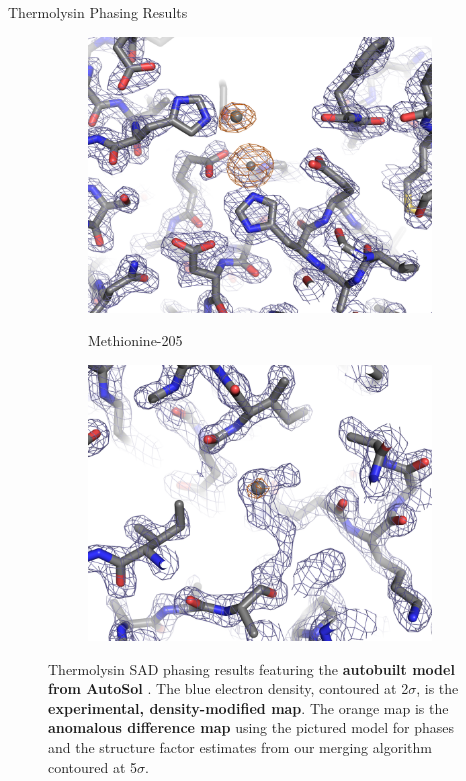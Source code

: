 \documentclass[final]{beamer}
\newlength{\colwidth}
\begin{document}
\begin{frame}[t]
\begin{columns}[t]
\begin{column}{\colwidth}
\begin{block}{Thermolysin Phasing Results}
\begin{figure}[]
\begin{subfigure}[t]{0.45\textwidth}
      \includegraphics[width=\textwidth]{figures/thermolysin/zinc.png}
    \end{subfigure}\hfill
    \begin{subfigure}[t]{0.45\textwidth}
      \centering
      Methionine-205\bigskip

      \includegraphics[width=\textwidth]{figures/thermolysin/sulfur_2.png}
    \end{subfigure}
    \RaggedRight
    \bigskip

    Thermolysin SAD phasing results featuring the \textbf{autobuilt model from AutoSol} \cite{terwilliger_decision-making_2009}. The blue electron density, contoured at 2$\sigma$, is the \textbf{experimental, density-modified map}. The orange map is the \textbf{anomalous difference map} using the pictured model for phases and the structure factor estimates from our merging algorithm contoured at 5$\sigma$.
  \end{figure}
  

\end{block}
\end{column}
\end{columns}
\end{frame}
\end{document}
